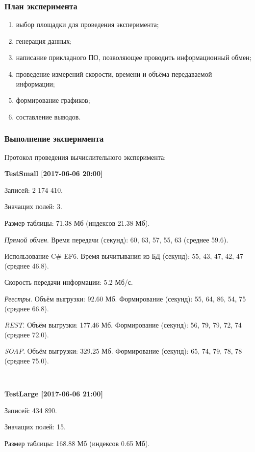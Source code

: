 \subsubsection*{План эксперимента}

\begin{enumerate}
	\item выбор площадки для проведения эксперимента;
	\item генерация данных;
	\item написание прикладного ПО, позволяющее проводить информационный обмен;
	\item проведение измерений скорости, времени и объёма передаваемой информации;
	\item формирование графиков;
	\item составление выводов.
\end{enumerate}

\subsubsection*{Выполнение эксперимента}

Протокол проведения вычислительного эксперимента:

\textbf{TestSmall [2017-06-06 20:00]}

Записей: 2 174 410.

Значащих полей: 3.

Размер таблицы: 71.38 Мб (индексов 21.38 Мб).

\textit{Прямой обмен}.
Время передачи (секунд): 60, 63, 57, 55, 63 (среднее 59.6).

Использование C\# EF6.
Время вычитывания из БД (секунд): 55, 43, 47, 42, 47 (среднее 46.8).

Скорость передачи информации: 5.2 Мб/с.

\textit{Реестры}.
Объём выгрузки: 92.60 Мб.
Формирование (секунд): 55, 64, 86, 54, 75 (среднее 66.8).

\textit{REST}.
Объём выгрузки: 177.46 Мб.
Формирование (секунд): 56, 79, 79, 72, 74 (среднее 72.0).

\textit{SOAP}.
Объём выгрузки: 329.25 Мб.
Формирование (секунд): 65, 74, 79, 78, 78 (среднее 75.0).

~

\textbf{TestLarge [2017-06-06 21:00]}

Записей: 434 890.

Значащих полей: 15.

Размер таблицы: 168.88 Мб (индексов 0.65 Мб).

